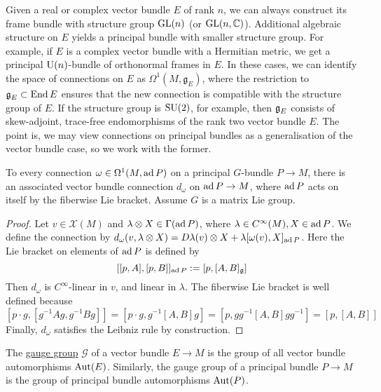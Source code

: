 Given a real or complex vector bundle $E$ of rank $n$, we can always construct 
its frame bundle with structure group $\operatorname{GL}(n)$ (or $\operatorname{GL}(n,\mathbb{C})$).
Additional algebraic structure on $E$ yields a principal bundle with smaller
structure group. For example,
if $E$ is a complex vector bundle with a Hermitian metric, we get a principal
$\operatorname{U}(n)$-bundle of orthonormal frames in  $E$. In these cases, we can identify
the space of connections on $E$ as $\Omega^1(M,\mathfrak{g}_E)$, where
the restriction to $\operatorname{\mathfrak{g}}_E \subset \operatorname{End} E$ ensures that the new connection is
compatible with the structure group of  $E$.
If the structure group is $\operatorname{SU}(2)$, for example, then
$\operatorname{\mathfrak{g}}_E$ consists of skew-adjoint, trace-free endomorphisms of the rank two vector
bundle $E$. The point is, we may view connections on principal bundles as a
generalisation of the vector bundle case, so we work with the former.

\begin{prop} \label{prop:adP_connection}
	To every connection $\omega \in \Omega^1(M,\operatorname{ad} P)$ on a principal
	$G$-bundle $P\to M$, there is an associated vector bundle connection
	$d_\omega$ on  $\operatorname{ad} P \to M$, where  $\operatorname{ad} P$ acts on itself by the fiberwise 
	Lie bracket. Assume $G$ is a matrix Lie group.
\end{prop}
\begin{proof}
	Let $v\in \mathcal{X}(M)$ and $\lambda\otimes X \in \Gamma(\operatorname{ad} P)$, where
	$\lambda\in C^\infty(M),X\in\operatorname{ad} P$. We define the 
	connection by $d_\omega(v,\lambda\otimes X) = 
	D\lambda(v) \otimes X + \lambda [\omega(v),X]_{\operatorname{ad} P}$. Here
	the Lie bracket on elements of $\operatorname{ad} P$ is defined by 
	\[
		[[p,A],[p,B]]_{\operatorname{ad} P} := [p,[A,B]_{\operatorname{\mathfrak{g}}}]
	\] 
	Then $d_\omega$ is $C^\infty$-linear in  $v$, and linear in  $\lambda$. 
	The fiberwise Lie bracket is well defined because 
	\[
		[p\cdot g, [g^{-1}Ag,g^{-1}Bg]] 
		= [p\cdot g, g^{-1}[A,B]g]
		= [p, gg^{-1}[A,B]gg^{-1}] = [p,[A,B]]
	\] 
	Finally, $d_\omega$ satisfies the Leibniz rule by construction. 
\end{proof}

\begin{defn}
	The \underline{gauge group} $\mathcal{G}$ of a vector bundle $E\to M$ is the group of all
	vector bundle automorphisms $\operatorname{Aut}(E)$. Similarly, the gauge group of a
	principal bundle $P\to M$ is the group of principal bundle automorphisms
	$\operatorname{Aut}(P)$.
\end{defn}

